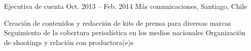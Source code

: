 \begin{joblist}
{		%
	}



\item[Ejecutiva de cuenta]{Oct. 2013 -- Feb. 2014 }     
  	{Más comunicaciones, Santiago, Chile}     
  	{

		\iftbftiny \vspace{-0.5cm} \fi
		\begin{itemize}
			  \iftbftiny \setlength\itemsep{-3pt} \fi
			  \cvitem[\checkmark]  Creación de contenidos y redacción de kits de prensa para diversas marcas                                       
			  \cvitem[\checkmark]  Seguimiento de la cobertura periodística en los medios nacionales                                          
			  \cvitem[\checkmark]  Organización de shootings y relación con productora(e)s

		\end{itemize}       
	}



   

\end{joblist}


%
%


